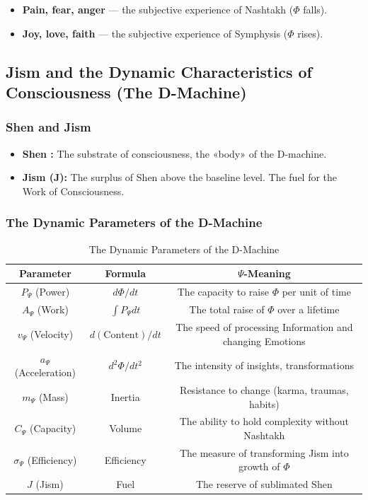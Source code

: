 \documentclass[a4paper,12pt]{article}
\begin{document}
	\begin{itemize}
		\item \textbf{Pain, fear, anger} — the subjective experience of Nashtakh ($\Phi$ falls).
		\item \textbf{Joy, love, faith} — the subjective experience of Symphysis ($\Phi$ rises).
	\end{itemize}
	
	\subsection{Jism and the Dynamic Characteristics of Consciousness (The D-Machine)}
	
	\subsubsection{Shen and Jism}
	
	\begin{itemize}
		\item \textbf{Shen :} The substrate of consciousness, the «body» of the D-machine.
		\item \textbf{Jism (J):} The surplus of Shen above the baseline level. The fuel for the Work of Consciousness.
	\end{itemize}
	
	\subsubsection{The Dynamic Parameters of the D-Machine}
	
	\begin{table}[H]
		\centering
		\begin{tabular}{|c|c|c|}
			\hline
			\textbf{Parameter} & \textbf{Formula} & \textbf{$\Psi$-Meaning} \\
			\hline
			$P_{\Psi}$ (Power) & $d\Phi/dt$ & The capacity to raise $\Phi$ per unit of time \\
			\hline
			$A_{\Psi}$ (Work) & $\int P_{\Psi} dt$ & The total raise of $\Phi$ over a lifetime \\
			\hline
			$v_{\Psi}$ (Velocity) & $d(\text{Content})/dt$ & The speed of processing Information and changing Emotions \\
			\hline
			$a_{\Psi}$ (Acceleration) & $d^2\Phi/dt^2$ & The intensity of insights, transformations \\
			\hline
			$m_{\Psi}$ (Mass) & Inertia & Resistance to change (karma, traumas, habits) \\
			\hline
			$C_{\Psi}$ (Capacity) & Volume & The ability to hold complexity without Nashtakh \\
			\hline
			$\sigma_{\Psi}$ (Efficiency) & Efficiency & The measure of transforming Jism into growth of $\Phi$ \\
			\hline
			$J$ (Jism) & Fuel & The reserve of sublimated Shen \\
			\hline
		\end{tabular}
		\caption{The Dynamic Parameters of the D-Machine}
	\end{table}
	
\end{document}
